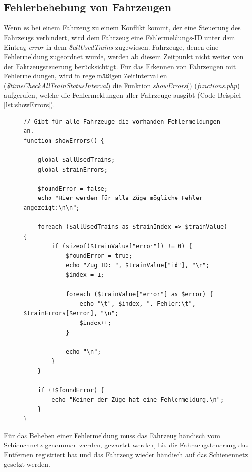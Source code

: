 \subsection{Fehlerbehebung von Fahrzeugen} \label{main_7}
Wenn es bei einem Fahrzeug zu einem Konflikt kommt, der eine Steuerung des Fahrzeugs verhindert, wird dem Fahrzeug eine Fehlermeldungs-ID unter dem Eintrag \textit{error} in dem \textit{\$allUsedTrains} zugewiesen. Fahrzeuge, denen eine Fehlermeldung zugeordnet wurde, werden ab diesem Zeitpunkt nicht weiter von der Fahrzeugsteuerung berücksichtigt. Für das Erkennen von Fahrzeugen mit Fehlermeldungen, wird in regelmäßigen Zeitintervallen (\textit{\$time\-Check\-All\-Train\-Sta\-tus\-Inter\-val}) die Funktion \textit{showErrors$($$)$} (\textit{functions.php}) aufgerufen, welche die Fehlermeldungen aller Fahrzeuge ausgibt (Code-Beispiel \ref{lst:showErrors}).
\begin{figure}
\begin{lstlisting}[caption={\textit{showErrors$($$)$} (\textit{functions.php})},captionpos=b,label={lst:showErrors}]
// Gibt für alle Fahrzeuge die vorhanden Fehlermeldungen an.
function showErrors() {

	global $allUsedTrains;
	global $trainErrors;

	$foundError = false;
	echo "Hier werden für alle Züge mögliche Fehler angezeigt:\n\n";

	foreach ($allUsedTrains as $trainIndex => $trainValue) {
		if (sizeof($trainValue["error"]) != 0) {
			$foundError = true;
			echo "Zug ID: ", $trainValue["id"], "\n";
			$index = 1;

			foreach ($trainValue["error"] as $error) {
				echo "\t", $index, ". Fehler:\t", $trainErrors[$error], "\n";
				$index++;
			}

			echo "\n";
		}
	}

	if (!$foundError) {
		echo "Keiner der Züge hat eine Fehlermeldung.\n";
	}
}
\end{lstlisting}
\end{figure}
Für das Beheben einer Fehlermeldung muss das Fahrzeug händisch vom Schienennetz genommen werden, gewartet werden, bis die Fahrzeugsteuerung das Entfernen registriert hat und das Fahrzeug wieder händisch auf das Schienennetz gesetzt werden.

